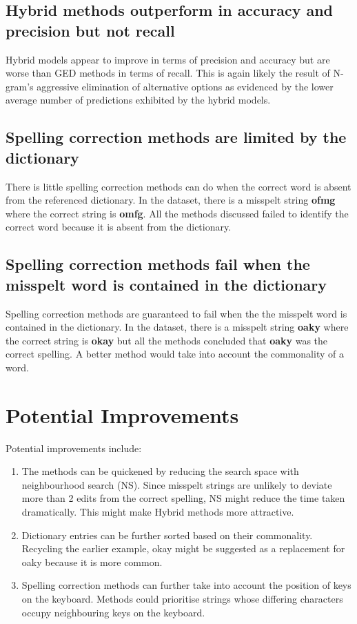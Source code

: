 \documentclass[11pt]{article}
\begin{document}
\subsection{Hybrid methods outperform in accuracy and precision but not recall}
Hybrid models appear to improve in terms of precision and accuracy but are worse than GED methods in terms of recall. This is again likely the result of N-gram's aggressive elimination of alternative options as evidenced by the lower average number of predictions exhibited by the hybrid models.

\subsection{Spelling correction methods are limited by the dictionary}
There is little spelling correction methods can do when the correct word is absent from the referenced dictionary. In the dataset, there is a misspelt string \textbf{ofmg} where the correct string is \textbf{omfg}. All the methods discussed failed to identify the correct word because it is absent from the dictionary.

\subsection{Spelling correction methods fail when the misspelt word is contained in the dictionary}
Spelling correction methods are guaranteed to fail when the the misspelt word is contained in the dictionary. In the dataset, there is a misspelt string \textbf{oaky} where the correct string is \textbf{okay} but all the methods concluded that \textbf{oaky} was the correct spelling. A better method would take into account the commonality of a word. 

\section{Potential Improvements}
Potential improvements include:
\begin{enumerate}
\item The methods can be quickened by reducing the search space with neighbourhood search (NS). Since misspelt strings are unlikely to deviate more than 2 edits from the correct spelling, NS might reduce the time taken dramatically. This might make Hybrid methods more attractive.
\item Dictionary entries can be further sorted based on their commonality. Recycling the earlier example, okay might be suggested as a replacement for oaky because it is more common. 
\item Spelling correction methods can further take into account the position of keys on the keyboard. Methods could prioritise strings whose differing characters occupy neighbouring keys on the keyboard.
\end{enumerate}
\end{document}
